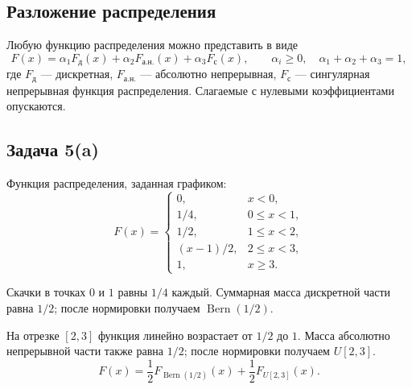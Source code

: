 \clearpage
\subsection{Разложение распределения}

\begin{remark}
    Любую функцию распределения можно представить в виде
    \[
        F(x)=\alpha_1F_{\text{д}}(x)
            +\alpha_2F_{\text{а.н.}}(x)
            +\alpha_3F_{\text{с}}(x),
        \qquad
        \alpha_i\geq0,\quad \alpha_1+\alpha_2+\alpha_3=1,
    \]
    где $F_{\text{д}}$ --- дискретная,
    $F_{\text{а.н.}}$ --- абсолютно непрерывная,
    $F_{\text{с}}$ --- сингулярная непрерывная функция распределения.
    Слагаемые с нулевыми коэффициентами опускаются.
\end{remark}

\subsection{Задача 5(a)}

\begin{solution}
    Функция распределения, заданная графиком:
    \[
        F(x)=\begin{cases}
            0,&x<0,\\
            1/4,&0\leq x<1,\\
            1/2,&1\leq x<2,\\
            (x-1)/2,&2\leq x<3,\\
            1,&x\geq3.
        \end{cases}
    \]
    \begin{center}
    \end{center}
    Скачки в точках $0$ и $1$ равны $1/4$ каждый.
    Суммарная масса дискретной части равна $1/2$;
    после нормировки получаем $\operatorname{Bern}(1/2)$.

    На отрезке $[2,3]$ функция линейно возрастает от $1/2$ до $1$.
    Масса абсолютно непрерывной части также равна $1/2$;
    после нормировки получаем $U[2,3]$.
    \[
        \boxed{F(x)=\frac12 F_{\operatorname{Bern}(1/2)}(x)
                    +\frac12 F_{U[2,3]}(x).}
    \]
\end{solution}
\endgroup
